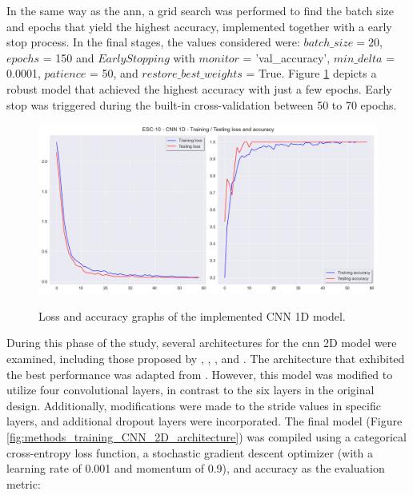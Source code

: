 In the same way as the \gls{ann}, a grid search was performed to find the batch size and epochs that yield the highest accuracy, implemented together with a early stop process. In the final stages, the values considered were: $batch\_size = 20$, $epochs$ = 150 and $EarlyStopping$ with $monitor$ = 'val\_accuracy', $min\_delta$ = 0.0001, $patience$ = 50, and $restore\_best\_weights$ = True. Figure \ref{fig:methods_training_CNN_1D_loss_and_accuracy_graphs} depicts a robust model that achieved the highest accuracy with just a few epochs. Early stop was triggered during the built-in cross-validation between 50 to 70 epochs.


\begin{figure}[htbp]
    \raggedright
        \caption{Loss and accuracy graphs of the implemented CNN 1D model.}
        \includegraphics[width=1\textwidth]{resources/images/050-methods/Methods_training_CNN1D_loss_accuracy.png}
        \label{fig:methods_training_CNN_1D_loss_and_accuracy_graphs}
\end{figure} 


During this phase of the study, several architectures for the \gls{cnn} 2D model were examined, including those proposed by \textcite{Piczak2015}, \textcite{Su2020}, \textcite{Luz2021}, and \textcite{Chu2023}. The architecture that exhibited the best performance was adapted from \textcite{Su2020}. However, this model was modified to utilize four convolutional layers, in contrast to the six layers in the original design. Additionally, modifications were made to the stride values in specific layers, and additional dropout layers were incorporated. The final model (Figure \ref{fig:methods_training_CNN_2D_architecture}) was compiled using a categorical cross-entropy loss function, a stochastic gradient descent optimizer (with a learning rate of 0.001 and momentum of 0.9), and accuracy as the evaluation metric:

